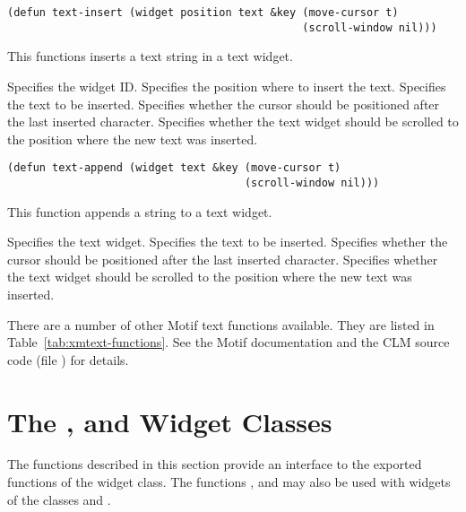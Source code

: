 \begin{lispd}
\syntax\begin{verbatim}
(defun text-insert (widget position text &key (move-cursor t)
                                              (scroll-window nil)))
\end{verbatim}
\beschr This functions inserts a text string in a text widget.
\parameter
\begin{paramd}
 Specifies the widget ID.
 Specifies the position where to insert the text.
 Specifies the text to be inserted.
 Specifies whether the cursor should be positioned after
the last inserted character.
 Specifies whether the text widget should be scrolled to the position where the new text was inserted.
\end{paramd}
\end{lispd}

\begin{lispd}
\syntax\begin{verbatim}
(defun text-append (widget text &key (move-cursor t)
                                     (scroll-window nil)))
\end{verbatim}
\beschr This function appends a string to a text widget.
\parameter
\begin{paramd}
 Specifies the text widget.
 Specifies the text to be inserted.
 Specifies whether the cursor should be positioned after
the last inserted character.
 Specifies whether the text widget should be scrolled to the position where the new text was inserted.
\end{paramd}
\end{lispd}

There are a number of other Motif text functions available. They are listed in
Table~\ref{tab:xmtext-functions}. See the Motif documentation and the CLM
source code (file ) for details.

\section{The ,  and  Widget Classes}

The functions described in this section provide an interface to the exported
functions of the  widget class. The functions ,
 and  may also be used with widgets
of the classes  and .
\pagebreak

